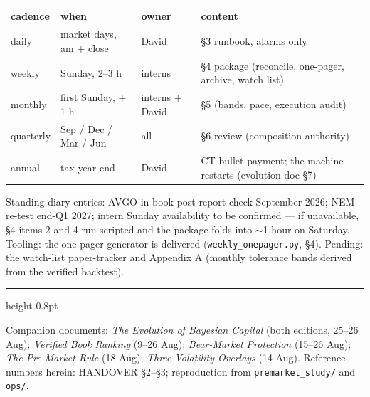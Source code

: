 \documentclass[11pt,a4paper]{article}
\newcommand{\tabnote}[1]{\begin{center}\begin{minipage}{0.92\textwidth}
  \footnotesize\color{bcgrey}#1\end{minipage}\end{center}}
\begin{document}
\begin{center}
\begin{tabular}{llll}
\toprule
cadence & when & owner & content \\
\midrule
daily     & market days, am + close & David & \S3 runbook, alarms only \\
weekly    & Sunday, 2--3 h          & interns & \S4 package (reconcile, one-pager, archive, watch list) \\
monthly   & first Sunday, $+$1 h    & interns $+$ David & \S5 (bands, pace, execution audit) \\
quarterly & Sep / Dec / Mar / Jun   & all & \S6 review (composition authority) \\
annual    & tax year end            & David & CT bullet payment; the machine restarts (evolution doc \S7) \\
\bottomrule
\end{tabular}
\end{center}

\tabnote{Standing diary entries: AVGO in-book post-report check September
2026; NEM re-test end-Q1 2027; intern Sunday availability to be confirmed ---
if unavailable,
\S4 items 2 and 4 run scripted and the package folds into $\sim$1 hour on
Saturday. Tooling: the one-pager generator is delivered
(\texttt{weekly\_onepager.py}, \S4). Pending: the watch-list paper-tracker
and Appendix A (monthly tolerance bands derived from the verified
backtest).}

\vspace{0.4cm}
{\color{bcnavy}\hrule height 0.8pt}
\vspace{0.2cm}
{\footnotesize\color{bcgrey} Companion documents: \emph{The Evolution of
Bayesian Capital} (both editions, 25--26 Aug); \emph{Verified Book Ranking}
(9--26 Aug); \emph{Bear-Market Protection} (15--26 Aug); \emph{The
Pre-Market Rule} (18 Aug); \emph{Three Volatility Overlays} (14 Aug).
Reference numbers herein: HANDOVER \S2--\S3; reproduction from
\texttt{premarket\_study/} and \texttt{ops/}.}
\end{document}
